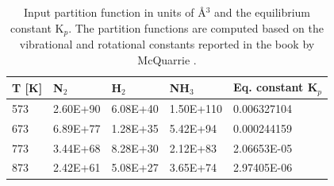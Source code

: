 \begin{table}[H]
\centering
\begin{tabular}{l|l|l|l|l}
T [K] &   N$_2$ & H$_2$ & NH$_3$ & Eq. constant K$_p$\\
\hline
573 & 2.60E+90 & 6.08E+40 & 1.50E+110 & 0.006327104\\
673 & 6.89E+77 & 1.28E+35 & 5.42E+94 & 0.000244159\\
773 & 3.44E+68 & 8.28E+30 & 2.12E+83 & 2.06653E-05\\
873 & 2.42E+61 & 5.08E+27 & 3.65E+74 & 2.97405E-06\\
\hline
\end{tabular}
\caption{Input partition function in units of \AA$^3$ and the equilibrium constant K$_p$.
The partition functions are computed based on the vibrational and rotational constants reported in the book by McQuarrie \cite{McQuarrie2000}.}
\label{Tutorial reaction-input}
\end{table}



\begin{center}
\end{center}



